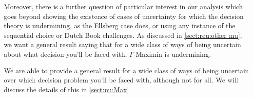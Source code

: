 \documentclass[a4paper]{article}
\renewcommand\P{\mathbb{P}} %
\newcommand\EU{\mathrm{EU}}
\newcommand{\IP}{\P}
\newcommand{\todoinfo}[2][]{\todo[backgroundcolor=orange!80,bordercolor=black,linecolor=gray!80, #1,inline,caption={}]{#2}}
\newenvironment{CCM rewritten}
{\begingroup\color{blue}} %
{\endgroup}              %
\begin{document}
{
\label{sect:gamma:other mu}

Moreover, there is a further question of particular interest in our analysis which goes beyond showing the existence of cases of uncertainty for which the decision theory is undermining, as the Ellsberg case does, or using any instance of the sequential choice or Dutch Book challenges. As discussed in \cref{sect:reu:other mu}, we want a general result saying that for a wide class of ways of being uncertain about what decision you'll be faced with, $\Gamma$-Maximin is undermining.

We are able to provide a general result for a wide class of ways of being uncertain over which decision problem you'll be faced with, although not for all. We will discuss the details of this in \cref{sect:nu:Max}. 


}

\end{document}
